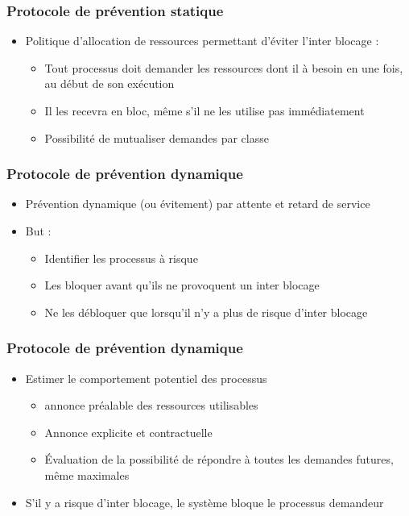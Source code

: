 \begin{frame}
\frametitle{Protocole de prévention statique}
\begin{itemize}
\item Politique d’allocation de ressources permettant d’éviter l’inter blocage :
\begin{itemize}
\item Tout processus doit demander les ressources dont il à besoin en une fois, au début de son exécution
\item Il les recevra en bloc, même s’il ne les utilise pas immédiatement
\item Possibilité de mutualiser demandes par classe
\end{itemize}
\end{itemize}
\end{frame}

\begin{frame}
\frametitle{Protocole de prévention dynamique}
\begin{itemize}
\item Prévention dynamique (ou évitement) par attente et retard de service
\item But :
\begin{itemize}
\item Identifier les processus à risque
\item Les bloquer avant qu’ils ne provoquent un inter blocage
\item Ne les débloquer que lorsqu’il n’y a plus de risque d’inter blocage
\end{itemize}
\end{itemize}
\end{frame}

\begin{frame}
\frametitle{Protocole de prévention dynamique}
\begin{itemize}
\item <1-> Estimer le comportement potentiel des processus
\begin{itemize}
\item annonce préalable des ressources utilisables
\item Annonce explicite et contractuelle
\item Évaluation de la possibilité de répondre à toutes les demandes futures, même maximales
\end{itemize}
\item <2-> S’il y a risque d’inter blocage, le système bloque le processus demandeur
\end{itemize}
\end{frame}

